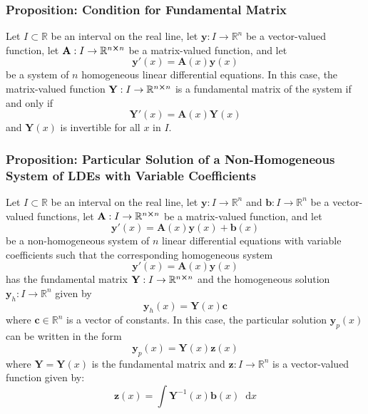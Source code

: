 \documentclass[11pt, a4paper]{article}
\newcommand{\diff}{\mathop{}\!\mathrm{d}} %
\newcommand{\R}{\mathbb{R}} %
\begin{document}
\subsubsection{Proposition: Condition for Fundamental Matrix}
Let $ I \subset \R $ be an interval on the real line, let $ \bm{y} : I \to \R^n $ be a vector-valued function, let $ \mathbf{A} : I \to \R^{n \cross n} $ be a matrix-valued function, and let
\begin{equation*}
	\bm{y}'(x) = \mathbf{A}(x) \bm{y}(x)
\end{equation*}
be a system of $ n $ homogeneous linear differential equations. In this case, the matrix-valued function $ \mathbf{Y} : I \to \R^{n\cross n} $ is a fundamental matrix of the system if and only if 
\begin{equation*}
	\mathbf{Y}'(x) = \mathbf{A}(x) \mathbf{Y}(x) 
\end{equation*}
and $ \mathbf{Y}(x) $ is invertible for all $ x $ in $ I $.


\subsubsection{Proposition: Particular Solution of a Non-Homogeneous System of LDEs with Variable Coefficients}
Let $ I \subset \R $ be an interval on the real line, let $ \bm{y} : I \to \R^n $ and $ \bm{b} : I \to \R^n $ be a vector-valued functions, let $ \mathbf{A} : I \to \R^{n \cross n} $ be a matrix-valued function, and let
\begin{equation*}
	\bm{y}'(x) = \mathbf{A}(x) \bm{y}(x) + \bm{b}(x)
\end{equation*}
be a non-homogeneous system of $ n $ linear differential equations with variable coefficients such that the corresponding homogeneous system
\begin{equation*}
	\bm{y}'(x) = \mathbf{A}(x) \bm{y}(x)
\end{equation*}
has the fundamental matrix $ \mathbf{Y} : I \to \R^{n \cross n} $ and the homogeneous solution $ \bm{y}_h : I \to \R^n $ given by
\begin{equation*}
	 \bm{y}_h(x) = \mathbf{Y}(x) \bm{c}
\end{equation*}
where $ \bm{c} \in \R^n $ is a vector of constants. In this case, the particular solution $ \bm{y}_p(x) $ can be written in the form
\begin{equation*}
	\bm{y}_p(x) = \mathbf{Y}(x) \bm{z}(x)
\end{equation*}
where $ \mathbf{Y} = \mathbf{Y}(x) $ is the fundamental matrix and $ \bm{z}: I \to \R^n $ is a vector-valued function given by:
\begin{equation*}
	\bm{z}(x) = \int \mathbf{Y}^{-1}(x) \bm{b}(x) \diff x
\end{equation*}
\end{document}
